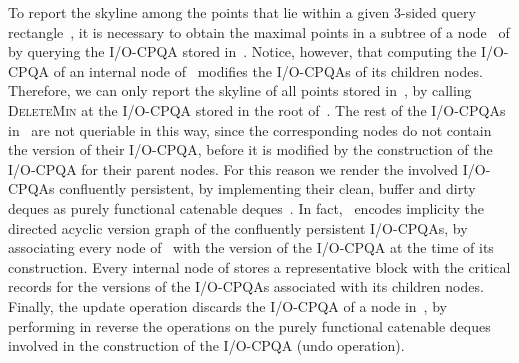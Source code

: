 \documentclass[]{article}
\begin{document}
To report the skyline among the points that lie within a given 3-sided query
rectangle~, it is necessary to obtain
the maximal points in a subtree of a node~ of  by querying the I/O-CPQA
stored in~. Notice, however, that computing the I/O-CPQA of an internal
node of~ modifies the I/O-CPQAs of its children nodes. Therefore, we can
only report the skyline of all points stored in~, by calling
\textsc{DeleteMin} at the I/O-CPQA stored in the root of~. The rest of the
I/O-CPQAs in~ are not queriable in this way, since the corresponding nodes
do not contain the version of their I/O-CPQA, before it is modified by the
construction of the I/O-CPQA for their parent nodes. For this reason we render
the involved I/O-CPQAs confluently persistent, by implementing their clean,
buffer and dirty deques as purely functional catenable deques~\cite{KT99}. In
fact,~ encodes implicity the directed acyclic version graph of the
confluently persistent I/O-CPQAs, by associating every node of~ with the
version of the I/O-CPQA at the time of its construction. Every internal node
of  stores a representative block with the critical records for the
versions of the I/O-CPQAs associated with its children nodes. Finally, the
update operation discards the I/O-CPQA of a node in~, by performing in
reverse the operations on the purely functional catenable deques involved in
the construction of the I/O-CPQA (undo operation).
\end{document}

